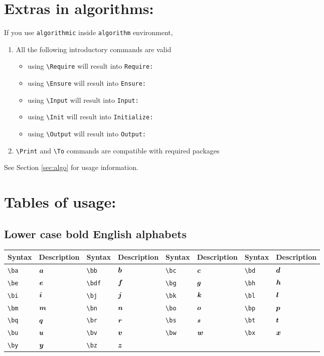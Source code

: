 \documentclass{article}
\begin{document}
	\section{Extras in algorithms:}
	If you use \texttt{algorithmic} inside \texttt{algorithm} environment,
	\begin{enumerate}
		\item All the following introductory commands are valid
		\begin{itemize}
			\item using \verb|\Require| will result into \texttt{Require:}
			\item using \verb|\Ensure| will result into \texttt{Ensure:}
			\item using \verb|\Input| will result into \texttt{Input:}
			\item using \verb|\Init| will result into \texttt{Initialize:}
			\item using \verb|\Output| will result into \texttt{Output:}
		\end{itemize}
		\item \verb|\Print| and \verb|\To| commands are compatible with required packages
	\end{enumerate}
	See Section \ref{sec:algo} for usage information.
	
	
	\newpage
	\section{Tables of usage:}
	\subsection{Lower case bold English alphabets}
	\begin{table}[H]
		\begin{tabular}{|l|l|l|l|l|l|l|l|}
			\hline
			Syntax	&	Description	&	Syntax	&	Description	&	Syntax	&	Description	&	Syntax	&	Description \\
			\hline
			\verb|\ba|	&	$\boldsymbol{a}$	&	\verb|\bb|	&	$\boldsymbol{b}$	&	\verb|\bc|	&	$\boldsymbol{c}$	&	\verb|\bd|	&	$\boldsymbol{d}$ \\
			\verb|\be|	&	$\boldsymbol{e}$	&	\verb|\bdf|	&	$\boldsymbol{f}$	&	\verb|\bg|	&	$\boldsymbol{g}$	&	\verb|\bh|	&	$\boldsymbol{h}$ \\
			\verb|\bi|	&	$\boldsymbol{i}$	&	\verb|\bj|	&	$\boldsymbol{j}$	&	\verb|\bk|	&	$\boldsymbol{k}$	&	\verb|\bl|	&	$\boldsymbol{l}$ \\
			\verb|\bm|	&	$\boldsymbol{m}$	&	\verb|\bn|	&	$\boldsymbol{n}$	&	\verb|\bo|	&	$\boldsymbol{o}$	&	\verb|\bp|	&	$\boldsymbol{p}$ \\
			\verb|\bq|	&	$\boldsymbol{q}$	&	\verb|\br|	&	$\boldsymbol{r}$	&	\verb|\bs|	&	$\boldsymbol{s}$	&	\verb|\bt|	&	$\boldsymbol{t}$ \\
			\verb|\bu|	&	$\boldsymbol{u}$	&	\verb|\bv|	&	$\boldsymbol{v}$	&	\verb|\bw|	&	$\boldsymbol{w}$	&	\verb|\bx|	&	$\boldsymbol{x}$ \\
			\verb|\by|	&	$\boldsymbol{y}$	&	\verb|\bz|	&	$\boldsymbol{z}$	&		&		&		&	 \\
			\hline	
		\end{tabular}
	\end{table}
\end{document}
